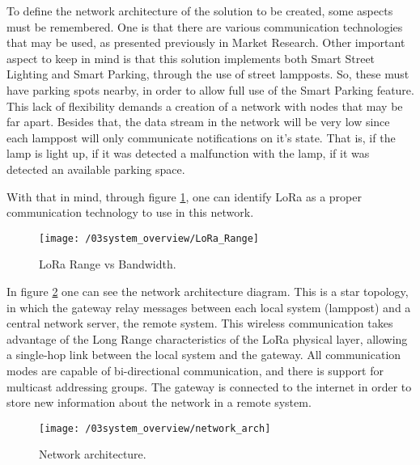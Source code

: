 To define the network architecture of the solution to be created, some aspects must be remembered. One is that there are various communication technologies that may be used, as presented previously in Market Research. Other important aspect to keep in mind is that this solution implements both Smart Street Lighting and Smart Parking, through the use of street lampposts. So, these must have parking spots nearby, in order to allow full use of the Smart Parking feature. This lack of flexibility demands a creation of a network with nodes that may be far apart. Besides that, the data stream in the network will be very low since each lamppost will only communicate notifications on it's state. That is, if the lamp is light up, if it was detected a malfunction with the lamp, if it was detected an available parking space. 

With that in mind, through figure \ref{fig:LoRa_Range}, one can identify LoRa as a proper communication technology to use in this network.

\clearpage

\begin{figure}[ht]
	\centering
	\texttt{[image: /03system\_overview/LoRa\_Range]}
	\caption{LoRa Range vs Bandwidth.}
	\label{fig:LoRa_Range}
\end{figure}

In figure \ref{fig:network_arch} one can see the network architecture diagram. This is a star topology, in which the gateway relay messages between each local system (lamppost) and a central network server, the remote system. This wireless communication takes advantage of the Long Range characteristics of the LoRa physical layer, allowing a single-hop link between the local system and the gateway. All communication modes are capable of bi-directional communication, and there is support for multicast addressing groups. The gateway is connected to the internet in order to store new information about the network in a remote system.

\begin{figure}[ht]
	\centering
	\texttt{[image: /03system\_overview/network\_arch]}
	\caption{Network architecture.}
	\label{fig:network_arch}
\end{figure}
\clearpage



